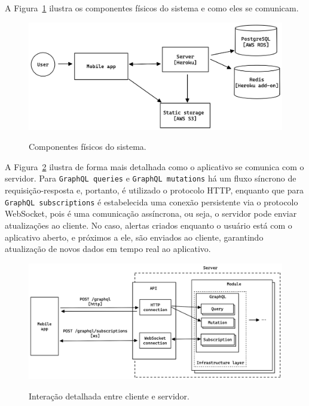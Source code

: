 A Figura~\ref{f.system} ilustra os componentes físicos do sistema e como eles se comunicam.

\begin{figure}[h]
	\caption{\small Componentes físicos do sistema.}
	\centering
	\includegraphics[width=\textwidth]{../diagrams/out/system.png}
	\label{f.system}
\end{figure}

A Figura~\ref{f.system_server_api} ilustra de forma mais detalhada como o aplicativo se comunica com o servidor. Para \texttt{GraphQL queries} e \texttt{GraphQL mutations} há um fluxo síncrono de requisição-resposta e, portanto, é utilizado o protocolo HTTP, enquanto que para \texttt{GraphQL subscriptions} é estabelecida uma conexão persistente via o protocolo WebSocket, pois é uma comunicação assíncrona, ou seja, o servidor pode enviar atualizações ao cliente. No caso, alertas criados enquanto o usuário está com o aplicativo aberto, e próximos a ele, são enviados ao cliente, garantindo atualização de novos dados em tempo real ao aplicativo.

\begin{figure}[h]
	\caption{\small Interação detalhada entre cliente e servidor.}
	\centering
	\includegraphics[width=\textwidth]{../diagrams/out/system_server_api.png}
	\label{f.system_server_api}
\end{figure}

